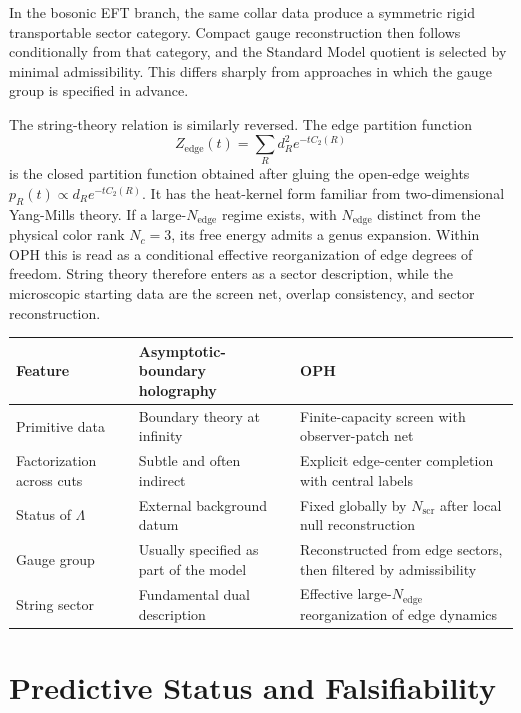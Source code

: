 \documentclass[11pt]{article}
\begin{document}
In the bosonic EFT branch, the same collar data produce a symmetric rigid transportable sector category. Compact gauge reconstruction then follows conditionally from that category, and the Standard Model quotient is selected by minimal admissibility. This differs sharply from approaches in which the gauge group is specified in advance.

The string-theory relation is similarly reversed. The edge partition function
\[
Z_{\mathrm{edge}}(t)=\sum_R d_R^2 e^{-t C_2(R)}
\]
is the closed partition function obtained after gluing the open-edge weights $p_R(t)\propto d_R e^{-tC_2(R)}$. It has the heat-kernel form familiar from two-dimensional Yang-Mills theory. If a large-$N_{\mathrm{edge}}$ regime exists, with $N_{\mathrm{edge}}$ distinct from the physical color rank $N_c=3$, its free energy admits a genus expansion. Within OPH this is read as a conditional effective reorganization of edge degrees of freedom. String theory therefore enters as a sector description, while the microscopic starting data are the screen net, overlap consistency, and sector reconstruction.

\begingroup
\footnotesize
\begin{tabular}{@{}>{\raggedright\arraybackslash}p{}>{\raggedright\arraybackslash}p{}>{\raggedright\arraybackslash}p{}@{}}
\toprule
Feature & Asymptotic-boundary holography & OPH \\
\midrule
Primitive data & Boundary theory at infinity & Finite-capacity screen with observer-patch net \\
Factorization across cuts & Subtle and often indirect & Explicit edge-center completion with central labels \\
Status of $\Lambda$ & External background datum & Fixed globally by $N_{\mathrm{scr}}$ after local null reconstruction \\
Gauge group & Usually specified as part of the model & Reconstructed from edge sectors, then filtered by admissibility \\
String sector & Fundamental dual description & Effective large-$N_{\mathrm{edge}}$ reorganization of edge dynamics \\
\bottomrule
\end{tabular}
\endgroup

\section{Predictive Status and Falsifiability}
\end{document}
